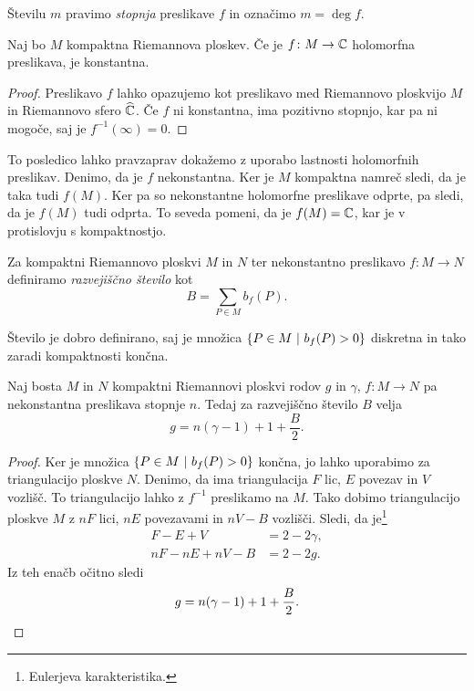 Številu $m$ pravimo \emph{stopnja} preslikave $f$ in označimo
$m = \deg f$.

\begin{posledica}
Naj bo $M$ kompaktna Riemannova ploskev. Če je $f \colon M \to \mathbb{C}$
holomorfna preslikava, je konstantna.
\end{posledica}

\begin{proof}
Preslikavo $f$ lahko opazujemo kot preslikavo med Riemannovo
ploskvijo $M$ in Riemannovo sfero $\widehat{\mathbb{C}}$. Če $f$ ni konstantna, ima
pozitivno stopnjo, kar pa ni mogoče, saj je $f^{-1}(\infty) = 0$.
\end{proof}

To posledico lahko pravzaprav dokažemo z uporabo lastnosti
holomorfnih preslikav. Denimo, da je $f$ nekonstantna. Ker je $M$
kompaktna namreč sledi, da je taka tudi $f(M)$. Ker pa so
nekonstantne holomorfne preslikave odprte, pa sledi, da je $f(M)$
tudi odprta. To seveda pomeni, da je $f(M) = \mathbb{C}$, kar je v
protislovju s kompaktnostjo.

\begin{definicija}
Za kompaktni Riemannovo ploskvi $M$ in $N$ ter nekonstantno
preslikavo $f \colon M \to N$ definiramo
\emph{razvejiščno število} kot
\[
B = \sum_{P \in M} b_f(P).
\]
\end{definicija}

Število je dobro definirano, saj je množica
$\left\{P \in M~\middle\vert~b_f(P) > 0\right\}$ diskretna in tako zaradi kompaktnosti
končna.

\begin{izrek}
\label{iz:rie-hur}
Naj bosta $M$ in $N$ kompaktni Riemannovi ploskvi rodov $g$ in
$\gamma$, $f \colon M \to N$ pa nekonstantna preslikava stopnje
$n$. Tedaj za razvejiščno število $B$ velja
\[
g = n(\gamma - 1) + 1 + \frac{B}{2}.
\]
\end{izrek}

\begin{proof}
Ker je množica $\left\{P \in M~\middle\vert~b_f(P) > 0\right\}$ končna, jo lahko
uporabimo za triangulacijo ploskve $N$. Denimo, da ima
triangulacija $F$ lic, $E$ povezav in $V$ vozlišč. To
triangulacijo lahko z $f^{-1}$ preslikamo na $M$. Tako dobimo
triangulacijo ploskve $M$ z $nF$ lici, $nE$ povezavami in $nV - B$
vozlišči. Sledi, da je\footnote{Eulerjeva karakteristika.}
\begin{align*}
F - E + V &= 2 - 2 \gamma,
\\
nF - nE + nV - B &= 2 - 2g.
\end{align*}
Iz teh enačb očitno sledi
\[
g = n(\gamma - 1) + 1 + \frac{B}{2}. \qedhere
\]
\end{proof}

